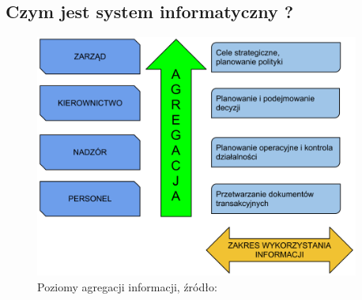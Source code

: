 	\subsection{Czym jest system informatyczny ?}
		\begin{figure}[h]
			\label{c3:information_level_figure}
			\begin{center}
				\includegraphics[width=0.95\textwidth]{images/poziomy_agregacji_informacji}
			\end{center}
			\caption[Poziomy agregacji informacji w systemie informatycznym]{
				Poziomy agregacji informacji, źródło: \cite{IDL}
			}
		\end{figure}	
	
